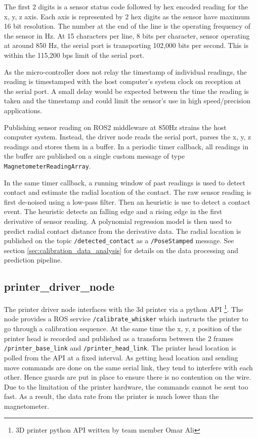 \documentclass{report}
\begin{document}
The first 2 digits is a sensor status code followed by hex encoded reading for the x, y, z axis. Each axis is represented by 2 hex digits as the sensor have maximum 16 bit resolution. The number at the end of the line is the operating frequency of the sensor in Hz. At 15 characters per line, 8 bits per character, sensor operating at around 850 Hz, the serial port is transporting 102,000 bits per second. This is within the 115,200 bps limit of the serial port.

As the micro-controller does not relay the timestamp of individual readings, the reading is timestamped with the host computer's system clock on reception at the serial port. A small delay would be expected between the time the reading is taken and the timestamp and could limit the sensor's use in high speed/precision applications.

Publishing sensor reading on ROS2 middleware at 850Hz strains the host computer system. Instead, the driver node reads the serial port, parses the x, y, z readings and stores them in a buffer. In a periodic timer callback, all readings in the buffer are published on a single custom message of type \verb|MagnetometerReadingArray|.

In the same timer callback, a running window of past readings is used to detect contact and estimate the radial location of the contact. The raw sensor reading is first de-noised using a low-pass filter. Then an heuristic is use to detect a contact event. The heuristic detects an falling edge and a rising edge in the first derivative of sensor reading. A polynomial regression model is then used to predict radial contact distance from the derivative data.
The radial location is published on the topic \verb|/detected_contact| as a \verb|/PoseStamped| message. See section \ref{sec:calibration_data_analysis} for details on the data processing and prediction pipeline.

\subsection{printer\_driver\_node}

The printer driver node interfaces with the 3d printer via a python API \footnote{3D printer python API written by team member Omar Ali}. The node provides a ROS service \verb|/calibrate_whisker| which instructs the printer to go through a calibration sequence. At the same time the x, y, z position of the printer head is recorded and published as a transform between the 2 frames \verb|/printer_base_link| and \verb|/printer_head_link|. The printer head location is polled from the API at a fixed interval. As getting head location and sending move commands are done on the same serial link, they tend to interfere with each other. Hence guards are put in place to ensure there is no contention on the wire. Due to the limitation of the printer hardware, the commands cannot be sent too fast. As a result, the data rate from the printer is much lower than the magnetometer.
\end{document}
